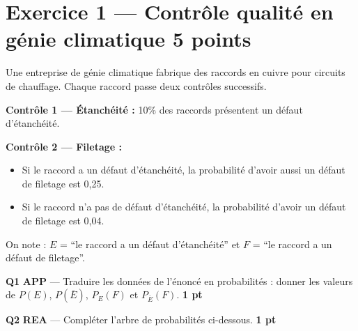 \documentclass[a4paper,11pt]{article}
\newcommand{\pts}[1]{\hfill\textcolor{gris}{\small\textbf{#1}}}
\newcommand{\comp}[1]{\colorbox{blue!10}{\scriptsize\textbf{#1}}}
\begin{document}
\newpage

\section*{Exercice 1 — Contrôle qualité en génie climatique \pts{5 points}}

\begin{contextebox}
Une entreprise de génie climatique fabrique des raccords en cuivre pour circuits de chauffage. Chaque raccord passe deux contrôles successifs.

\textbf{Contrôle 1 — Étanchéité :} 10\% des raccords présentent un défaut d'étanchéité.

\textbf{Contrôle 2 — Filetage :}
\begin{itemize}[nosep]
  \item Si le raccord a un défaut d'étanchéité, la probabilité d'avoir aussi un défaut de filetage est 0,25.
  \item Si le raccord n'a pas de défaut d'étanchéité, la probabilité d'avoir un défaut de filetage est 0,04.
\end{itemize}

On note : $E$ = ``le raccord a un défaut d'étanchéité'' et $F$ = ``le raccord a un défaut de filetage''.
\end{contextebox}

\vspace{6pt}

\textbf{Q1} \comp{APP} — Traduire les données de l'énoncé en probabilités : donner les valeurs de $P(E)$, $P(\overline{E})$, $P_E(F)$ et $P_{\overline{E}}(F)$. \pts{1 pt}

\begin{reponsebox}[3cm]
\dotfill

\dotfill

\dotfill
\end{reponsebox}

\textbf{Q2} \comp{REA} — Compléter l'arbre de probabilités ci-dessous. \pts{1 pt}

\begin{center}
\end{center}
\end{document}
